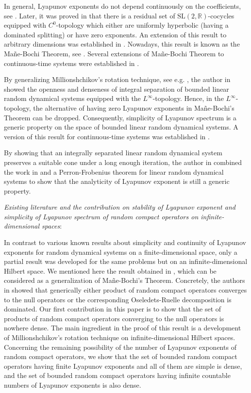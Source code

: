 \documentclass[pdflatex,sn-mathphys-num]{sn-jnl}%
\theoremstyle{thmstyleone}%
\theoremstyle{thmstyletwo}%
\theoremstyle{thmstylethree}%
\numberwithin{equation}{section}
\begin{document}
In general, Lyapunov exponents do not depend continuously on the coefficients, see \cite{Knill}. Later, it was proved in \cite[Theorem C]{Bochi2002} that there is a residual set of $\mbox{SL}(2,\mathbb R)$-cocycles equipped with $C^0$-topology which either are uniformly hyperbolic (having a dominated splitting) or have zero exponents. An extension of this result to arbitrary dimensions was established in \cite{BochiViana2005}.   Nowadays, this result is known as the Ma\~{n}e-Bochi Theorem, see \cite[Section 9.2]{Viana2014}. Several extensions of Ma\~{n}e-Bochi Theorem to continuous-time systems were established in \cite{Bessa2006,Bessa2008a}.  

By generalizing  Millionshchikov's rotation technique, see e.g. \cite{Millionshchikov}, the author in \cite{Cong05} showed the openness and denseness of integral separation of bounded linear random dynamical systems equipped with the $L^{\infty}$-topology. Hence, in the   $L^{\infty}$-topology, the alternative of having zero Lyapunov exponents in Ma\~{n}e-Bochi's Theorem can be dropped. Consequently, simplicity of Lyapunov spectrum is a generic property on the space of bounded linear random dynamical systems. A version of this result for continuous-time systems was established in \cite{Cong_Doan16}.

By showing that an integrally separated linear random dynamical system preserves a suitable
cone under a long enough iteration, the author in \cite{Doan17} combined the work in  \cite{Cong05} and a Perron-Frobenius theorem for linear random dynamical systems  \cite{Ruelle1979,Lian15,MierczynskiShen_01,MierczynskiShen_02,Rugh} to show that the analyticity of Lyapunov exponent is still a generic property.


\emph{Existing literature and the contribution on stability  of Lyapunov exponent and simplicity of Lyapunov spectrum of random compact operators on infinite-dimensional spaces}: 

In contrast to various known results about simplicity and continuity of Lyapunov exponents for random dynamical systems on a finite-dimensional space, only a partial result was developed for the same problems but on an infinite-dimensional Hilbert space. We mentioned here the result obtained in \cite{Bessa2008,Bessa2019}, which can be considered as a generalization of Ma\~{n}e-Bochi's Theorem. Concretely, the authors in  \cite{Bessa2008,Bessa2019} showed that generically either product of random compact operators converges to the null operators or the corresponding Oseledets-Ruelle decomposition is dominated. Our first contribution in this paper is to show that the set of products of random compact operators converging to the null operators is nowhere dense. The main ingredient in the proof of this result is a development of Millionshchikov’s rotation technique on infinite-dimensional Hilbert spaces.  Concerning the remaining possibility of the number of Lyapunov exponents of random compact operators, we show that the set of bounded random compact operators having finite Lyapunov exponents and all of them are simple is dense, and the set of bounded random compact operators having infinite countable numbers of Lyapunov exponents is also dense.
\end{document}
